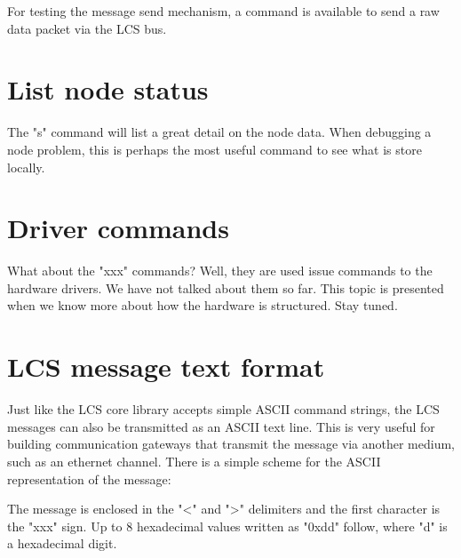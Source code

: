 For testing the message send mechanism, a command is available to send a raw data packet via the LCS bus.


\section{List node status}

The "s" command will list a great detail on the node data. When debugging a node problem, this is perhaps the most useful command to see what is store locally.


\section{Driver commands}



What about the "xxx" commands? Well, they are used issue commands to the hardware drivers. We have not talked about them so far. This topic is presented when we know more about how the hardware is structured. Stay tuned.

\section{LCS message text format}

Just like the LCS core library accepts simple ASCII command strings, the LCS messages can also be transmitted as an ASCII text line. This is very useful for building communication gateways that transmit the message via another medium, such as an ethernet channel. There is a simple scheme for the ASCII representation of the message:

%

The message is enclosed in the "<" and ">" delimiters and the first character is the "xxx" sign. Up to 8 hexadecimal values written as "0xdd" follow, where "d" is a hexadecimal digit.



